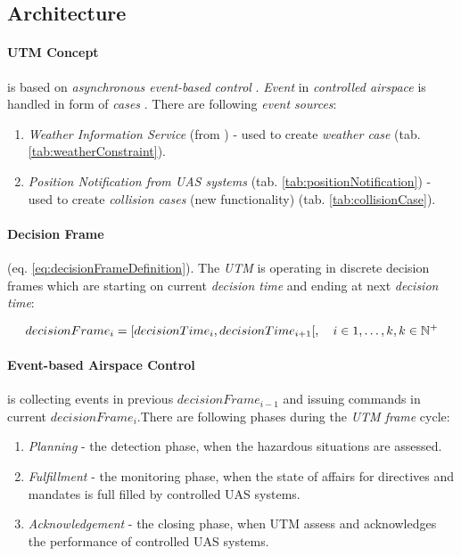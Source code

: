 \subsection{Architecture}\label{sec:utmArchitecture}
\paragraph{UTM Concept} is based on \emph{asynchronous event-based control} \cite{zimmer2011rule}. \emph{Event} in \emph{controlled airspace} is handled in form of \emph{cases} \cite{prevot2016uas}. There are following \emph{event sources}:

\begin{enumerate}
    \item \emph{Weather Information Service} (from \cite{zimmer2014selective}) - used to create \emph{weather case} (tab. \ref{tab:weatherConstraint}).
    
    \item \emph{Position Notification from UAS systems} (tab. \ref{tab:positionNotification}) - used to create \emph{collision cases} (new functionality) (tab. \ref{tab:collisionCase}).
\end{enumerate}


\paragraph{Decision Frame} (eq. \ref{eq:decisionFrameDefinition}). The \emph{UTM} is operating in discrete decision frames which are starting on current \emph{decision time} and ending at  next \emph{decision  time}:

\begin{equation}\label{eq:decisionFrameDefinition}
    decision Frame_i = [decision Time_i, decision Time_{i+1}[,\quad i \in {1,\dots,k}, k \in \mathbb{N}^+
\end{equation}

\paragraph{Event-based Airspace Control} is collecting  events in  previous $decisionFrame_{i-1}$ and issuing commands in current $decisionFrame_i$.There are following phases during the \emph{UTM frame} cycle:
\begin{enumerate}
    \item \emph{Planning} - the detection phase, when the hazardous situations are assessed.
    
    \item \emph{Fulfillment} - the monitoring phase, when the state of affairs for directives and mandates is full filled by controlled UAS systems. 
    
    \item \emph{Acknowledgement} - the closing phase, when UTM assess and acknowledges the performance of controlled UAS systems.
\end{enumerate}


